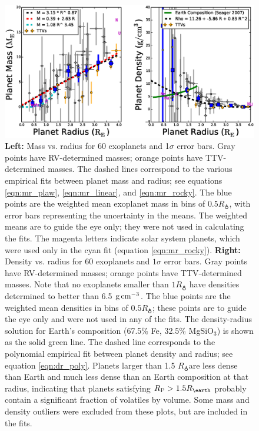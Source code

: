 \documentclass[iop]{emulateapj}
\newcommand{\gcmc}{\ensuremath{\rm g\,cm^{-3}}}
\newcommand{\gcc}{\gcmc}
\newcommand{\rpl}{\ensuremath{R_{\rm P}}}
\newcommand{\rearth}{\ensuremath{R_\earth}}
\begin{document}
\begin{figure}[htbp] %
   \centering
    \includegraphics[width=6in]{mr_small.eps} 
   \caption{\small \textbf{Left:} Mass vs. radius for 60 exoplanets and 1$\sigma$ error bars.  Gray points  have RV-determined masses; orange points have TTV-determined masses.  The dashed lines correspond to the various empirical fits between planet mass and radius; see equations \ref{eqn:mr_plaw}, \ref{eqn:mr_linear}, and \ref{eqn:mr_rocky}.  The blue points are the weighted mean exoplanet mass in bins of $0.5 \rearth$, with error bars representing the uncertainty in the means.  The weighted means are to guide the eye only; they were not used in calculating the fits.  The magenta letters indicate solar system planets, which were used only in the cyan fit (equation \ref{eqn:mr_rocky}).  \textbf{Right:} Density vs. radius for 60 exoplanets and $1\sigma$ error bars.  Gray points  have RV-determined masses; orange points have TTV-determined masses.  Note that no exoplanets smaller than $1\rearth$ have densities determined to better than 6.5 \gcc.  The blue points are the weighted mean densities in bins of $0.5 \rearth$; these points are to guide the eye only and were not used in any of the fits.  The \citet{Seager2007} density-radius solution for Earth's composition (67.5\% Fe, 32.5\% MgSiO$_3$) is shown as the solid green line.  The dashed line corresponds to the polynomial empirical fit between planet density and radius; see equation \ref{eqn:dr_poly}.  Planets larger than 1.5 \rearth are less dense than Earth and much less dense than an Earth composition at that radius, indicating that planets satisfying $\rpl > 1.5 \rearth$ probably contain a significant fraction of volatiles by volume.  Some mass and density outliers were excluded from these plots, but are included in the fits.}
   \label{fig:rm_4}
\end{figure}
\end{document}
